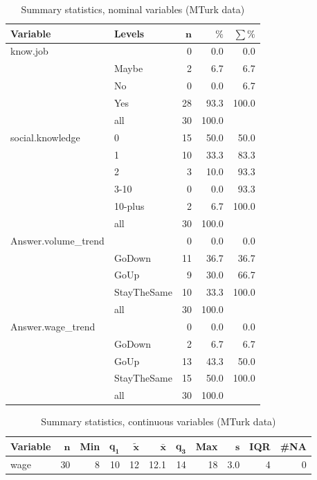 \documentclass[a4paper,10pt]{article}\usepackage[]{graphicx}\usepackage[]{color}
\begin{document}
\begin{table}[ht]
\centering
{\footnotesize
\begin{tabular}{ll|rrr}
 \textbf{Variable} & \textbf{Levels} & $\mathbf{n}$ & $\mathbf{\%}$ & $\mathbf{\sum \%}$ \\ 
  \hline
know.job &  & 0 & 0.0 & 0.0 \\ 
   & Maybe & 2 & 6.7 & 6.7 \\ 
   & No & 0 & 0.0 & 6.7 \\ 
   & Yes & 28 & 93.3 & 100.0 \\ 
   \hline
 & all & 30 & 100.0 &  \\ 
   \hline
\hline
social.knowledge & 0 & 15 & 50.0 & 50.0 \\ 
   & 1 & 10 & 33.3 & 83.3 \\ 
   & 2 & 3 & 10.0 & 93.3 \\ 
   & 3-10 & 0 & 0.0 & 93.3 \\ 
   & 10-plus & 2 & 6.7 & 100.0 \\ 
   \hline
 & all & 30 & 100.0 &  \\ 
   \hline
\hline
Answer.volume\_trend &  & 0 & 0.0 & 0.0 \\ 
   & GoDown & 11 & 36.7 & 36.7 \\ 
   & GoUp & 9 & 30.0 & 66.7 \\ 
   & StayTheSame & 10 & 33.3 & 100.0 \\ 
   \hline
 & all & 30 & 100.0 &  \\ 
   \hline
\hline
Answer.wage\_trend &  & 0 & 0.0 & 0.0 \\ 
   & GoDown & 2 & 6.7 & 6.7 \\ 
   & GoUp & 13 & 43.3 & 50.0 \\ 
   & StayTheSame & 15 & 50.0 & 100.0 \\ 
   \hline
 & all & 30 & 100.0 &  \\ 
   \hline
\hline
\end{tabular}
}
\caption{Summary statistics, nominal variables (MTurk data)} 
\label{tab1:25-9040}
\end{table}
\begin{table}[ht]
\centering
{\footnotesize
\begin{tabular}{lrrrrrrrrrr}
 \textbf{Variable} & $\mathbf{n}$ & \textbf{Min} & $\mathbf{q_1}$ & $\mathbf{\widetilde{x}}$ & $\mathbf{\bar{x}}$ & $\mathbf{q_3}$ & \textbf{Max} & $\mathbf{s}$ & \textbf{IQR} & \textbf{\#NA} \\ 
  \hline
wage & 30 & 8 & 10 & 12 & 12.1 & 14 & 18 & 3.0 & 4 & 0 \\ 
  \end{tabular}
}
\caption{Summary statistics, continuous variables (MTurk data)} 
\label{tab2:25-9040}
\end{table}
\end{document}
